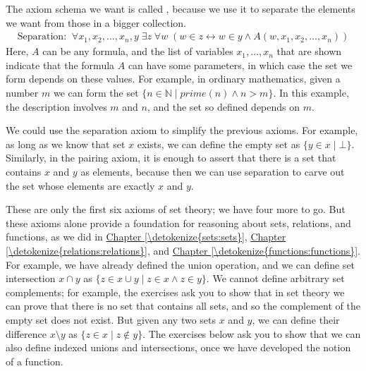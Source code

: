 \documentclass[letterpaper,10pt,english]{sphinxmanual}
\begin{document}
\sphinxAtStartPar
The axiom schema we want is called , because we use it to separate the elements we want from those in a bigger collection.
\begin{equation*}
\begin{split}\text{Separation:} \;\; \forall x_1, x_2, \ldots, x_n, y \; \exists z \; \forall w \; (w \in z \leftrightarrow w \in y \wedge A(w,x_1, x_2, \ldots, x_n))\end{split}
\end{equation*}
\sphinxAtStartPar
Here, \(A\) can be any formula, and the list of variables \(x_1, \ldots, x_n\) that are shown indicate that the formula \(A\) can have some parameters, in which case the set we form depends on these values. For example, in ordinary mathematics, given a number \(m\) we can form the set \(\{ n \in \mathbb{N} \mid \mathit{prime}(n) \wedge n > m\}\). In this example, the description involves \(m\) and \(n\), and the set so defined depends on \(m\).

\sphinxAtStartPar
We could use the separation axiom to simplify the previous axioms. For example, as long as we know that  set \(x\) exists, we can define the empty set as \(\{ y \in x \mid \bot \}\). Similarly, in the pairing axiom, it is enough to assert that there is a set that contains \(x\) and \(y\) as elements, because then we can use separation to carve out the set whose elements are exactly \(x\) and \(y\).

\sphinxAtStartPar
These are only the first six axioms of set theory; we have four more to go. But these axioms alone provide a foundation for reasoning about sets, relations, and functions, as we did in \hyperref[\detokenize{sets:sets}]{Chapter \ref{\detokenize{sets:sets}}}, \hyperref[\detokenize{relations:relations}]{Chapter \ref{\detokenize{relations:relations}}}, and \hyperref[\detokenize{functions:functions}]{Chapter \ref{\detokenize{functions:functions}}}. For example, we have already defined the union operation, and we can define set intersection \(x \cap y\) as \(\{ z \in x \cup y \mid z \in x \wedge z \in y \}\).  We cannot define arbitrary set complements; for example, the exercises ask you to show that in set theory we can prove that there is no set that contains all sets, and so the complement of the empty set does not exist. But given any two sets \(x\) and \(y\), we can define their difference \(x \setminus y\) as \(\{ z \in x \mid z \notin y \}\). The exercises below ask you to show that we can also define indexed unions and intersections, once we have developed the notion of a function.
\end{document}
